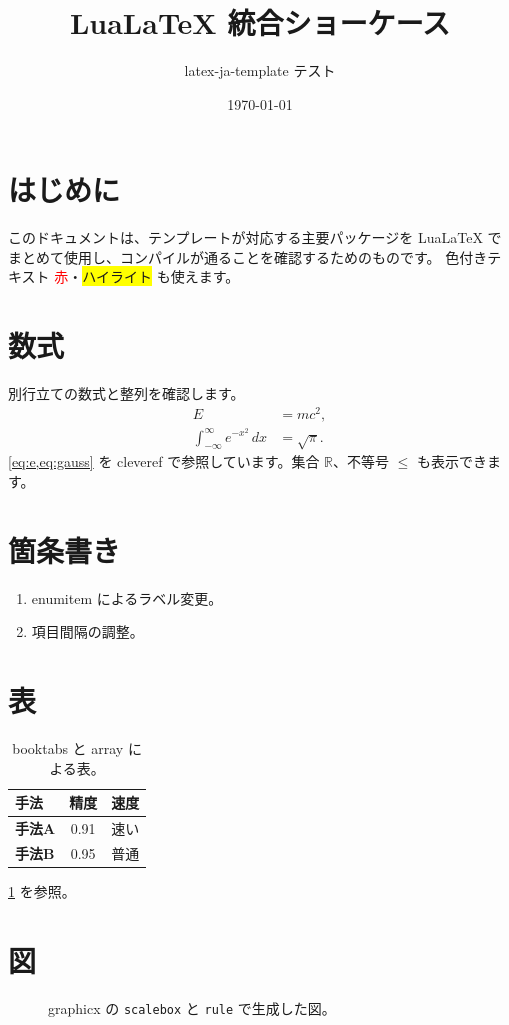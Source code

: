 \documentclass[lualatex,paper=a4,fontsize=10.5pt]{jlreq}
\title{LuaLaTeX 統合ショーケース}
\author{latex-ja-template テスト}
\date{\today}
\begin{document}
\maketitle

\section{はじめに}
このドキュメントは、テンプレートが対応する主要パッケージを LuaLaTeX で
まとめて使用し、コンパイルが通ることを確認するためのものです。
色付きテキスト \textcolor{red}{赤}・\colorbox{yellow}{ハイライト} も使えます。

\section{数式}
別行立ての数式と整列を確認します。
\begin{align}
  E &= mc^2, \label{eq:e} \\
  \int_{-\infty}^{\infty} e^{-x^2}\,dx &= \sqrt{\pi}. \label{eq:gauss}
\end{align}
\cref{eq:e,eq:gauss} を cleveref で参照しています。集合 $\mathbb{R}$、不等号 $\leq$ も表示できます。

\section{箇条書き}
\begin{enumerate}[label=(\arabic*), noitemsep]
  \item enumitem によるラベル変更。
  \item 項目間隔の調整。
\end{enumerate}

\section{表}
\begin{table}[h]
  \centering
  \caption{booktabs と array による表。}
  \label{tab:show}
  \begin{tabular}{>{\bfseries}l c c}
    \toprule
    手法 & 精度 & 速度 \\
    \midrule
    手法A & 0.91 & 速い \\
    手法B & 0.95 & 普通 \\
    \bottomrule
  \end{tabular}
\end{table}
\cref{tab:show} を参照。

\section{図}
\begin{figure}[h]
  \centering
  \scalebox{1.0}{\color{blue}\rule{4cm}{2cm}}
  \caption{graphicx の \texttt{scalebox} と \texttt{rule} で生成した図。}
  \label{fig:show}
\end{figure}
\end{document}
